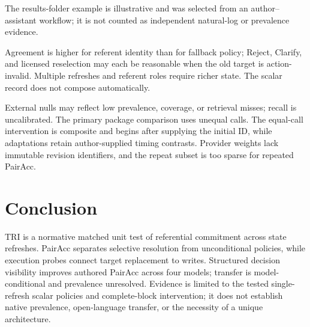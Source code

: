 \documentclass[letterpaper]{article}
\begin{document}
The results-folder example is illustrative and was selected from an author--assistant workflow;
it is not counted as independent natural-log or prevalence evidence.

Agreement is higher for referent identity than for fallback policy; Reject, Clarify, and
licensed reselection may each be reasonable when the old target is action-invalid. Multiple
refreshes and referent roles require richer state. The scalar record does not compose automatically.

External nulls may reflect low prevalence, coverage, or retrieval misses; recall is uncalibrated.
The primary package comparison uses unequal calls. The equal-call intervention is composite and
begins after supplying the initial ID, while adaptations retain author-supplied timing contrasts.
Provider weights lack immutable revision identifiers, and the repeat subset is too sparse for
repeated PairAcc.

\section{Conclusion}

TRI is a normative matched unit test of referential commitment across state refreshes. PairAcc
separates selective resolution from unconditional policies, while execution probes connect target
replacement to writes. Structured decision visibility improves authored PairAcc across four
models; transfer is model-conditional and prevalence unresolved. Evidence is limited to the tested
single-refresh scalar policies and complete-block intervention; it does not establish native
prevalence, open-language transfer, or the necessity of a unique architecture.

\clearpage
{\small

}
\end{document}
